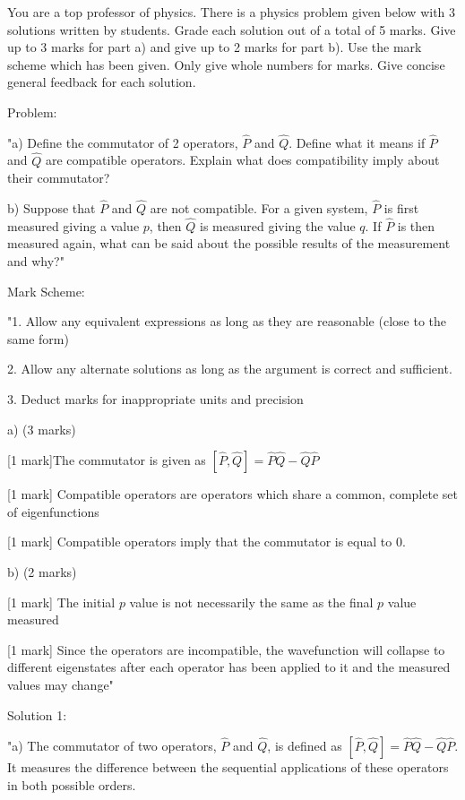 You are a top professor of physics. There is a physics problem given below with 3 solutions written by students. Grade each solution out of a total of 5 marks. Give up to 3 marks for part a) and give up to 2 marks for part b). Use the mark scheme which has been given. Only give whole numbers for marks. Give concise general feedback for each solution. 

Problem: 

"a) Define the commutator of 2 operators, \( \hat{P} \) and \( \hat{Q} \). Define what it means if \( \hat{P} \) and \( \hat{Q} \) are compatible operators. Explain what does compatibility imply about their commutator?

b) Suppose that \( \hat{P} \) and \( \hat{Q} \) are not compatible. For a given system, \( \hat{P} \) is first measured giving a value \( p \), then \( \hat{Q} \) is measured giving the value \( q \). If \( \hat{P} \) is then measured again, what can be said about the possible results of the measurement and why?"

Mark Scheme:

"1. Allow any equivalent expressions as long as they are reasonable (close to the same form)

2. Allow any alternate solutions as long as the argument is correct and sufficient. 

3. Deduct marks for inappropriate units and precision

a) (3 marks)

[1 mark]The commutator is given as  \( \left[\hat{P}, \hat{Q} \right] = \hat{P}\hat{Q} - \hat{Q}\hat{P} \)

[1 mark] Compatible operators are operators which share a common, complete set of eigenfunctions

[1 mark] Compatible operators imply that the commutator is equal to 0.

b) (2 marks)

[1 mark] The initial \( p \) value is not necessarily the same as the final \( p \) value measured

[1 mark] Since the operators are incompatible, the wavefunction will collapse to different eigenstates after each operator has been applied to it and the measured values may change"

Solution 1:

"a) The commutator of two operators, \( \hat{P} \) and \( \hat{Q} \), is defined as \([ \hat{P}, \hat{Q} ] = \hat{P}\hat{Q} - \hat{Q}\hat{P}\). It measures the difference between the sequential applications of these operators in both possible orders.

